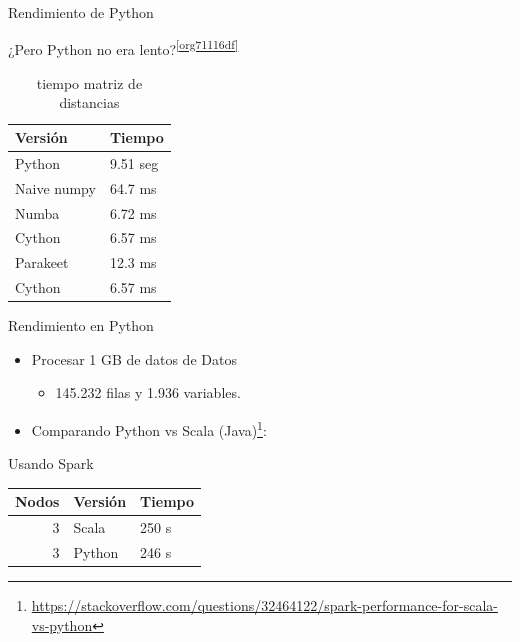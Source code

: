 \documentclass[bigger,unknownkeysallowed]{beamer}
\begin{document}
\begin{frame}[label={sec:org3c07bb0}]{Rendimiento de Python}
\begin{block}{¿Pero Python no era lento?\textsuperscript{\ref{org71116df}}}
\begin{table}[htbp]
\caption{tiempo matriz de distancias}
\centering
\begin{tabular}{ll}
\hline
Versión & Tiempo\\
\hline
Python & 9.51 seg\\
Naive numpy & 64.7 ms\\
Numba & 6.72 ms\\
Cython & 6.57 ms\\
Parakeet & 12.3 ms\\
Cython & 6.57 ms\\
\hline
\end{tabular}
\end{table}
\end{block}
\end{frame}

\begin{frame}[label={sec:org547194d}]{Rendimiento en Python}
\begin{itemize}
\item Procesar 1 GB de datos de Datos 
\begin{itemize}
\item 145.232 filas y 1.936 variables.
\end{itemize}

\item Comparando Python vs Scala (Java)\footnote{\url{https://stackoverflow.com/questions/32464122/spark-performance-for-scala-vs-python}}:
\end{itemize}

\begin{block}{Usando Spark}
\begin{center}
\begin{tabular}{rll}
\hline
Nodos & Versión & Tiempo\\
\hline
3 & Scala & 250 s\\
3 & Python & 246 s\\
\hline
\end{tabular}
\end{center}
\end{block}
\end{frame}
\end{document}

